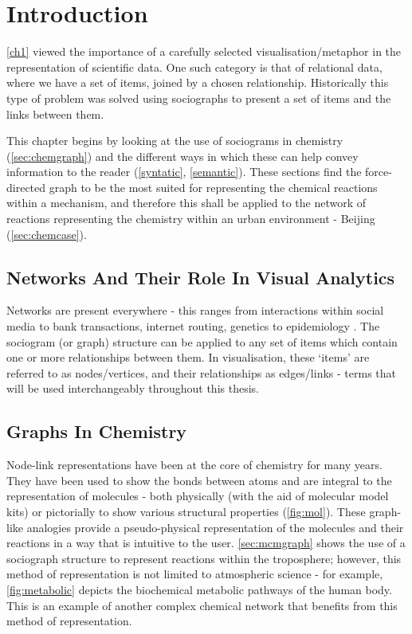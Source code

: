 
\section{Introduction}
\autoref{ch1} viewed the importance of a carefully selected visualisation/metaphor in the representation of scientific data. One such category is that of relational data, where we have a set of items, joined by a chosen relationship. Historically
this type of problem was solved using sociographs to present a set of items and the links between them. 

This chapter begins by looking at the use of sociograms in chemistry (\autoref{sec:chemgraph}) and the different ways in which these can help convey information to the reader (\autoref{syntatic}, \autoref{semantic}). These sections find the force-directed graph to be the most suited for representing the chemical reactions within a mechanism, and therefore this shall be applied to the network of reactions representing the chemistry within an urban environment - Beijing (\autoref{sec:chemcase}).


\subsection{Networks And Their Role In Visual Analytics} \label{sec:va}
Networks are present everywhere - this ranges from interactions within social media to bank transactions, internet routing, genetics to epidemiology \citep{worldmap, epidim,neoj4,netneuro,prbank,ch4,ch8,ch9}. The sociogram (or graph) structure can be applied to any set of items which contain one or more relationships between them. In visualisation, these `items' are referred to as nodes/vertices, and their relationships as edges/links \citep{ch1} - terms that will be used interchangeably throughout this thesis. 


\subsection{Graphs In Chemistry}\label{sec:chemgraph}
Node-link representations have been at the core of chemistry for many years. They have been used to show the bonds between atoms and are integral to the representation of molecules - both physically (with the aid of molecular model kits) or pictorially to show various structural properties (\autoref{fig:mol}). These graph-like analogies provide a pseudo-physical representation of the molecules and their reactions in a way that is intuitive to the user. \autoref{sec:mcmgraph} shows the use of a sociograph structure to represent reactions within the troposphere; however, this method of representation is not limited to atmospheric science - for example, \autoref{fig:metabolic} depicts the biochemical metabolic pathways of the human body. This is an example of another complex chemical network that benefits from this method of representation.


